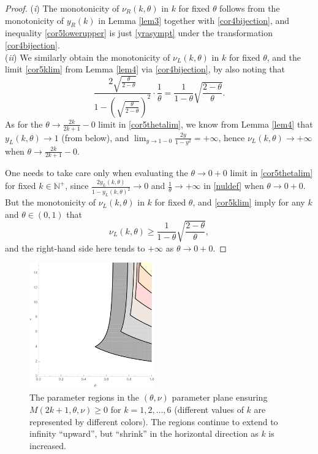 \documentclass[a4paper]{article}
\newcommand{\te}{\theta}
\newcommand{\nul}{\nu_L(k,\theta)}
\newcommand{\nur}{\nu_R(k,\theta)}
\newcommand{\yl}{y_L(k,\theta)}
\newcommand{\yr}{y_R(k)}
\newcommand{\nplus}{\mathbb{N}^+}
\begin{document}
\begin{proof} (\textit{i}) The monotonicity of $\nur$ in $k$ for fixed $\te$ follows from the monotonicity of 
$\yr$ in Lemma \ref{lem3} together with \eqref{cor4bijection}, and inequality \eqref{cor5lowerupper} is 
just \eqref{yrasympt} under the transformation \eqref{cor4bijection}.\\
(\textit{ii}) We similarly obtain the monotonicity of $\nul$ in $k$ for fixed $\te$, and the limit \eqref{cor5klim} from Lemma \ref{lem4} via \eqref{cor4bijection}, by also noting that
\[
\frac{2\sqrt{\frac{\te}{2-\te}}}{1-\left(\sqrt{\frac{\te}{2-\te}}\right)^2}\cdot \frac{1}{\te}=\frac{1}{1-\theta }\sqrt{\frac{2-\theta }{\theta }}.
\]
As for the $\te\to\frac{2k}{2k+1}-0$ limit in \eqref{cor5thetalim}, we know from Lemma \ref{lem4} that $\yl\to 1$ (from below), and $\lim_{y\to 1-0}\frac{2y}{1-y^2}=+\infty$, hence $\nul\to+\infty$ when $\te\to\frac{2k}{2k+1}-0$.

One needs to take care only when evaluating the $\te\to 0+0$ limit in \eqref{cor5thetalim} for fixed $k\in\nplus$,  since $\frac{2\yl}{1-\yl^2}\to 0$ and $\frac{1}{\te}\to+\infty$ in \eqref{nuldef} when $\te\to0+0$. But 
the monotonicity of $\nul$ in $k$ for fixed $\te$, and \eqref{cor5klim} imply for any $k$ and $\te\in(0,1)$ that 
\[
\nul\ge\frac{1}{1-\theta }\sqrt{\frac{2-\theta }{\theta }},
\]
and the right-hand side here tends to $+\infty$ as $\te\to 0+0$.
\end{proof}

\begin{figure}
\begin{center}
\includegraphics[width=0.48\textwidth]{fig_variousk.pdf}
\caption{The parameter regions in the $(\te,\nu)$ parameter plane ensuring $M(2k+1,\te,\nu)\ge 0$ for $k=1, 2, \ldots, 6$ (different values of $k$ are represented by different colors). The regions continue to extend to infinity ``upward'', but ``shrink'' in the horizontal direction as $k$ is increased.}\label{fig_variousk}
\end{center}
\end{figure}
\end{document}
